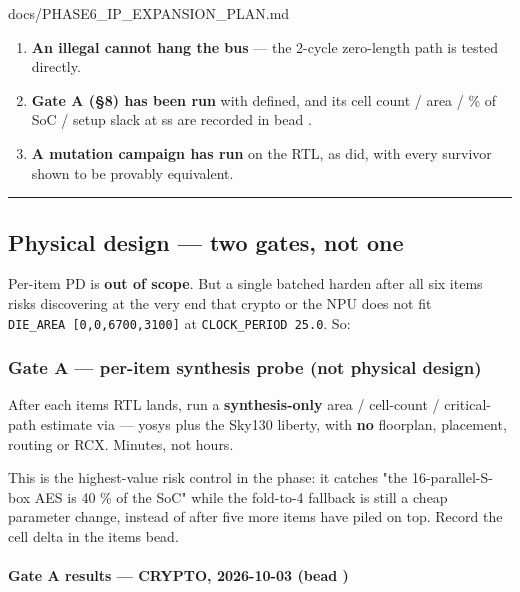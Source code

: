 \begin{relocated}{docs/PHASE6_IP_EXPANSION_PLAN.md}
\begin{enumerate}
  \textbf{exclusively}, per cycle.
\item
  \textbf{An illegal  cannot hang the bus} --- the 2-cycle
  zero-length path is tested directly.
\item
  \textbf{Gate A (§8) has been run} with  defined, and
  its cell count / area / \% of SoC / setup slack at ss are recorded in
  bead .
\item
  \textbf{A mutation campaign has run} on the RTL, as 
  did, with every survivor shown to be provably equivalent.
\end{enumerate}

\begin{center}\rule{0.5\linewidth}{0.5pt}\end{center}

\subsection{Physical design --- two gates, not one}\label{ds:ch:phase6-ip-expansion-plan:8-physical-design-two-gates-not-one}

Per-item PD is \textbf{out of scope}. But a single batched harden after
all six items risks discovering at the very end that crypto or the NPU
does not fit
\texttt{DIE\_\allowbreak{}AREA\ [0,\allowbreak{}0,\allowbreak{}6700,\allowbreak{}3100]}
at \texttt{CLOCK\_\allowbreak{}PERIOD\ 25.\allowbreak{}0}. So:

\subsubsection{Gate A --- per-item synthesis probe (not physical
design)}\label{ds:ch:phase6-ip-expansion-plan:gate-a-per-item-synthesis-probe-not-physical-design}

After each item\textquotesingle s RTL lands, run a
\textbf{synthesis-only} area / cell-count / critical-path estimate via
 --- yosys plus the Sky130
liberty, with \textbf{no} floorplan, placement, routing or RCX. Minutes,
not hours.

This is the highest-value risk control in the phase: it catches "the
16-parallel-S-box AES is 40 \% of the SoC" while the fold-to-4 fallback
is still a cheap parameter change, instead of after five more items have
piled on top. Record the cell delta in the item\textquotesingle s bead.

\paragraph{\texorpdfstring{Gate A results --- CRYPTO, 2026-10-03 (bead
)}{Gate A results --- CRYPTO, 2026-10-03 (bead )}}\label{ds:ch:phase6-ip-expansion-plan:gate-a-results-crypto-2026-10-03-bead-f7vs10}


\end{relocated}
